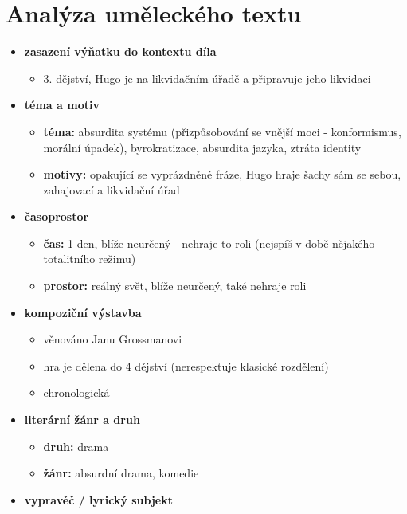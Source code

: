 \documentclass[11pt]{article}
\begin{document}
    \section*{Analýza uměleckého textu}
    \begin{itemize}
        \item\textbf{zasazení výňatku do kontextu díla}
        \begin{itemize}
            \item 3. dějství, Hugo je na likvidačním úřadě a připravuje jeho likvidaci
        \end{itemize}
        \item\textbf{téma a motiv}
        \begin{itemize}
            \item\textbf{téma: }absurdita systému (přizpůsobování se vnější moci - konformismus, morální úpadek), byrokratizace, absurdita jazyka, ztráta identity
            \item\textbf{motivy: }opakující se vyprázdněné fráze, Hugo hraje šachy sám se sebou, zahajovací a likvidační úřad
        \end{itemize}
        \item\textbf{časoprostor}
        \begin{itemize}
            \item\textbf{čas: }1 den, blíže neurčený - nehraje to roli (nejspíš v době nějakého totalitního režimu)
            \item\textbf{prostor: }reálný svět, blíže neurčený, také nehraje roli
        \end{itemize}
        \item\textbf{kompoziční výstavba}
        \begin{itemize}
            \item věnováno Janu Grossmanovi
            \item hra je dělena do 4 dějství (nerespektuje klasické rozdělení)
            \item chronologická
        \end{itemize}
        \item\textbf{literární žánr a druh}
        \begin{itemize}
            \item\textbf{druh: }drama
            \item\textbf{žánr: }absurdní drama, komedie
        \end{itemize}
        \item\textbf{vypravěč / lyrický subjekt}

\end{itemize}
\end{document}
